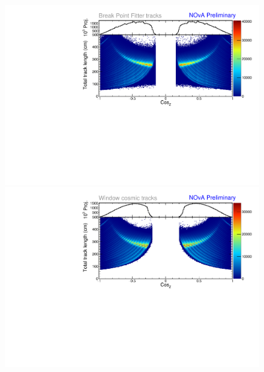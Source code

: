 \begin{enumerate}
\begin{enumerate}
\begin{figure}[!hbtp]
\includegraphics[width=\textwidth]{Plots/TBCalibration/DBSim_BPFPeaks_BPFTracks_dcosz_TotLength.pdf}
\includegraphics[width=\textwidth]{Plots/TBCalibration/DBSim_BPFPeaks_WTTracks_dcosz_TotLength.pdf}

\end{figure}
\end{enumerate}
\end{enumerate}
